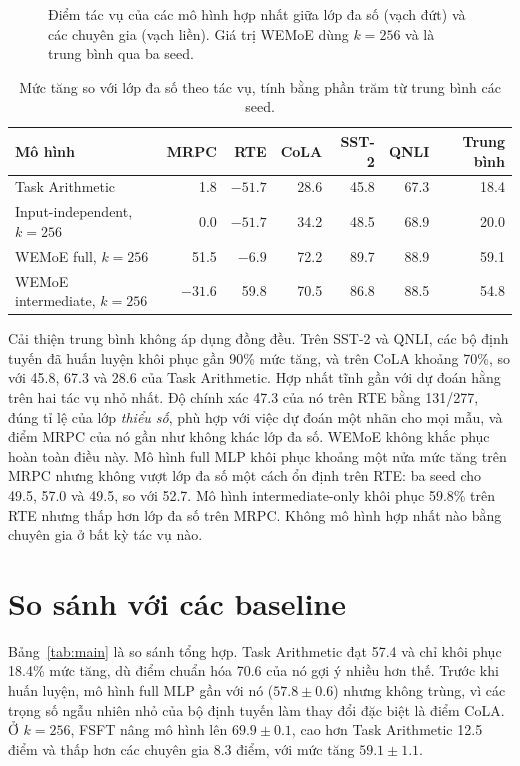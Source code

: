 \begin{figure}[htbp]
  \centering
  
  \caption{Điểm tác vụ của các mô hình hợp nhất giữa lớp đa số (vạch đứt) và các chuyên gia (vạch liền). Giá trị WEMoE dùng $k=256$ và là trung bình qua ba seed.}
  \label{fig:per-task}
\end{figure}

\begin{table}[htbp]
  \centering\tablestyle
  \caption{Mức tăng so với lớp đa số theo tác vụ, tính bằng phần trăm từ trung bình các seed.}
  \label{tab:gain}
  \begin{tabular}{l r r r r r r}
    \toprule
    Mô hình & MRPC & RTE & CoLA & SST-2 & QNLI & Trung bình\\
    \midrule
    Task Arithmetic & 1.8 & $-51.7$ & 28.6 & 45.8 & 67.3 & 18.4\\
    Input-independent, $k=256$ & 0.0 & $-51.7$ & 34.2 & 48.5 & 68.9 & 20.0\\
    WEMoE full, $k=256$ & 51.5 & $-6.9$ & 72.2 & 89.7 & 88.9 & 59.1\\
    WEMoE intermediate, $k=256$ & $-31.6$ & 59.8 & 70.5 & 86.8 & 88.5 & 54.8\\
    \bottomrule
  \end{tabular}
\end{table}

Cải thiện trung bình không áp dụng đồng đều. Trên SST-2 và QNLI, các bộ định tuyến đã huấn luyện khôi phục gần 90\% mức tăng, và trên CoLA khoảng 70\%, so với 45.8, 67.3 và 28.6 của Task Arithmetic. Hợp nhất tĩnh gần với dự đoán hằng trên hai tác vụ nhỏ nhất. Độ chính xác 47.3 của nó trên RTE bằng 131/277, đúng tỉ lệ của lớp \emph{thiểu số}, phù hợp với việc dự đoán một nhãn cho mọi mẫu, và điểm MRPC của nó gần như không khác lớp đa số. WEMoE không khắc phục hoàn toàn điều này. Mô hình full MLP khôi phục khoảng một nửa mức tăng trên MRPC nhưng không vượt lớp đa số một cách ổn định trên RTE: ba seed cho 49.5, 57.0 và 49.5, so với 52.7. Mô hình intermediate-only khôi phục 59.8\% trên RTE nhưng thấp hơn lớp đa số trên MRPC. Không mô hình hợp nhất nào bằng chuyên gia ở bất kỳ tác vụ nào.

\section{So sánh với các baseline}

Bảng~\ref{tab:main} là so sánh tổng hợp. Task Arithmetic đạt 57.4 và chỉ khôi phục 18.4\% mức tăng, dù điểm chuẩn hóa 70.6 của nó gợi ý nhiều hơn thế. Trước khi huấn luyện, mô hình full MLP gần với nó ($57.8\pm0.6$) nhưng không trùng, vì các trọng số ngẫu nhiên nhỏ của bộ định tuyến làm thay đổi đặc biệt là điểm CoLA. Ở $k=256$, FSFT nâng mô hình lên $69.9\pm0.1$, cao hơn Task Arithmetic 12.5 điểm và thấp hơn các chuyên gia 8.3 điểm, với mức tăng $59.1\pm1.1$.

